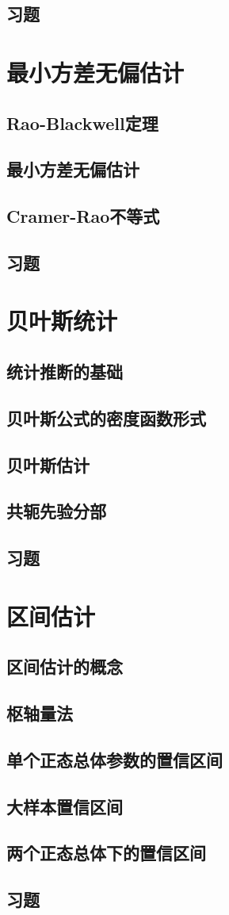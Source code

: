 \subsection{习题}

\section{最小方差无偏估计}
\subsection{Rao-Blackwell定理}
\subsection{最小方差无偏估计}
\subsection{Cramer-Rao不等式}
\subsection{习题}

\section{贝叶斯统计}
\subsection{统计推断的基础}
\subsection{贝叶斯公式的密度函数形式}
\subsection{贝叶斯估计}
\subsection{共轭先验分部}
\subsection{习题}

\section{区间估计}
\subsection{区间估计的概念}
\subsection{枢轴量法}
\subsection{单个正态总体参数的置信区间}
\subsection{大样本置信区间}
\subsection{两个正态总体下的置信区间}
\subsection{习题}
